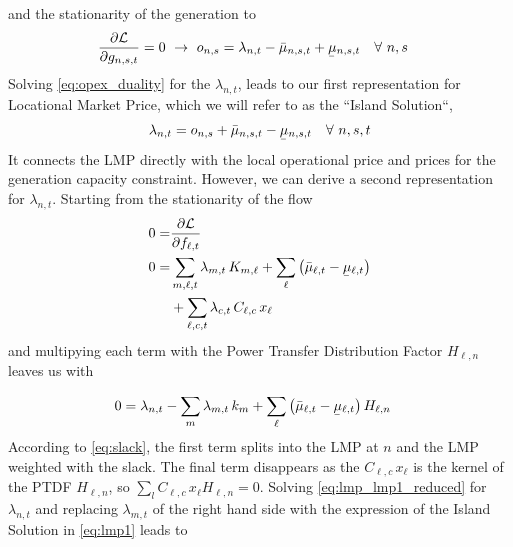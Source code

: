 \documentclass[11pt,twocolumn]{article}
\newcommand{\ubar}[1]{\underaccent{\bar}{#1}}
\newcommand{\generation}[1][n]{g_{#1,s,t}}
\newcommand{\opexGeneration}[1][n]{o_{#1,s}}
\newcommand{\incidence}[1][n]{K_{#1,\ell}}
\newcommand{\ptdf}[1][n]{H_{\ell,#1}}
\newcommand{\slack}[1][n]{k_{#1}}
\newcommand{\mulowergeneration}[1][n]{\ubar{\mu}_{#1,s,t}}
\newcommand{\muuppergeneration}[1][n]{\bar{\mu}_{#1,s,t}}
\newcommand{\mulowerflow}{\ubar{\mu}_{\ell,t}}
\newcommand{\muupperflow}{\bar{\mu}_{\ell,t}}
\newcommand{\lmp}[1][n]{\lambda_{#1,t}}
\newcommand{\flow}{f_{\ell,t}}
\newcommand{\cycle}{C_{\ell,c}}
\newcommand{\impedance}{x_\ell}
\newcommand{\cycleprice}{\lambda_{c,t}}
\newcommand{\lagrangian}{\mathcal{L}}
\newcommand{\Forall}[1]{\hspace{10pt} \forall \,\, #1 }
\newcommand{\pdv}[2]{\frac{\partial #1}{\partial #2}}
\begin{document}
and the stationarity of the generation to 
\begin{align}
 \pdv{\lagrangian}{\generation} &= 0 \,\, \rightarrow \,\,  
 \opexGeneration =  \lmp - \muuppergeneration + \mulowergeneration \Forall{n,s} \label{eq:opex_duality}
\end{align}
Solving \cref{eq:opex_duality} for the $\lmp$, leads to our first representation for Locational Market Price, which we will refer to as the ``Island Solution``,
\begin{align}
\lmp  =  \opexGeneration + \muuppergeneration - \mulowergeneration \Forall{n,s,t}
\label{eq:lmp1}
\end{align}
It connects the LMP directly with the local operational price and prices for the generation capacity constraint. However, we can derive a second representation for $\lmp$. Starting from the stationarity of the flow
\begin{align}
 0 =& \pdv{\lagrangian}{\flow}  \\
 \notag
 0 =&  \sum_{m,\ell,t} \lmp[m] \, \incidence[m]  + \sum_{\ell} \left( \muupperflow - \mulowerflow \right)  \\
 & +\sum_{\ell,c,t} \cycleprice \, \cycle \, \impedance
\end{align}
and multipying each term with the Power Transfer Distribution Factor $\ptdf$ leaves us with  

\begin{align}
  0 &= \lmp - \sum_m \lmp[m] \, \slack[m]  + \sum_{\ell} \left( \muupperflow - \mulowerflow \right) \ptdf
  \label{eq:lmp_lmp1_reduced}
\end{align}
According to \cref{eq:slack}, the first term splits into the LMP at $n$ and the LMP weighted with the slack. The final term disappears as the $\cycle \, \impedance$ is the kernel of the PTDF $\ptdf$, so $\sum_l \cycle \, \impedance \ptdf = 0$. Solving \cref{eq:lmp_lmp1_reduced} for $\lmp$ and replacing $\lmp[m]$ of the right hand side with the expression of the Island Solution in \cref{eq:lmp1} leads to 
\end{document}
